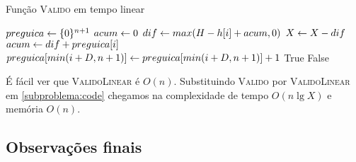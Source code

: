 \begin{algorithm}[H]
\caption{Função \textsc{Valido} em tempo linear}
\label{subproblema:code_linear}
\begin{algorithmic}[1]
    \State $preguica \leftarrow \{0\}^{n + 1}$
    \State $acum \leftarrow 0$
        \State $dif \leftarrow max(H - h[i] + acum, 0)$
        \State $X \leftarrow X - dif$
        \State $acum \leftarrow dif + preguica[i]$
        \State $preguica[min(i + D, n + 1)] \leftarrow preguica[min(i + D, n + 1)] + 1$
    \EndFor
        \State \Return True
    \Else
        \State \Return False
    \EndIf
\EndFunction
\end{algorithmic}
\end{algorithm}

É fácil ver que \textsc{ValidoLinear} é $O(n)$. Substituindo \textsc{Valido} por \textsc{ValidoLinear} em \ref{subproblema:code} chegamos na complexidade de tempo $O(n \lg X)$ e memória $O(n)$.

\subsection*{Observações finais}
